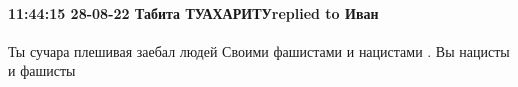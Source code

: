  
 
 
 
 

\paragraph{11:44:15 28-08-22 Табита ТУАХАРИТУreplied to Иван}

Ты сучара плешивая заебал людей
Своими фашистами и нацистами . Вы нацисты и фашисты



